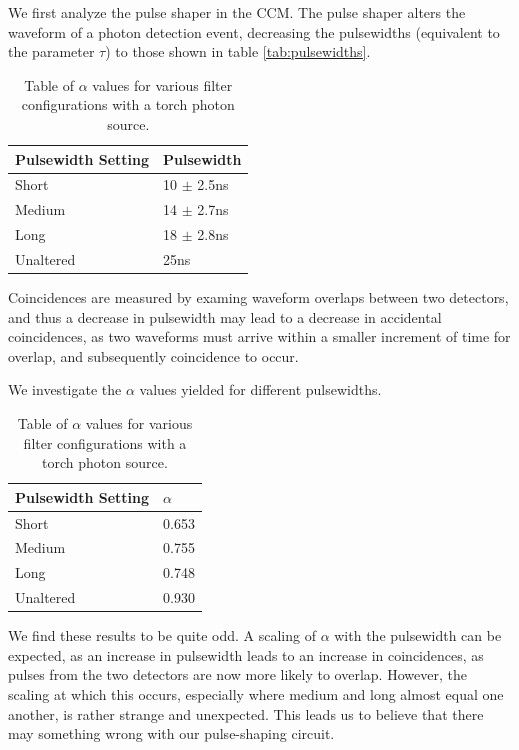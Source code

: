 \documentclass[letterpaper, 11 pt]{article}
\begin{document}
We first analyze the pulse shaper in the CCM. The pulse shaper alters the waveform of a
photon detection event, decreasing the pulsewidths (equivalent to the parameter $\tau$) to those shown in table \ref{tab:pulsewidths}.
\begin{table}[H]
    \centering
    \begin{tabular}{|l|l|}
    \hline
    \textbf{Pulsewidth Setting} & \textbf{Pulsewidth} \\ \hline
    Short        & 10 $\pm$ 2.5ns                   \\ \hline
    Medium        & 14 $\pm$ 2.7ns                   \\ \hline
    Long        & 18 $\pm$ 2.8ns                   \\ \hline
    Unaltered                  & 25ns                   \\ \hline
    \end{tabular}
    \caption{Table of $\alpha$ values for various filter configurations with a torch photon source.}
\end{table}\label{tab:pulsewidths}
Coincidences are measured by examing waveform overlaps between two
detectors, and thus a decrease in pulsewidth may lead to a decrease in accidental coincidences,
as two waveforms must arrive within a smaller increment of time for overlap,
and subsequently coincidence to occur.

We investigate the $\alpha$ values yielded for different pulsewidths.
\begin{table}[H]
    \centering
    \begin{tabular}{|l|l|}
    \hline
    \textbf{Pulsewidth Setting} & \textbf{$\alpha$} \\ \hline
    Short        & 0.653                   \\ \hline
    Medium        & 0.755                   \\ \hline
    Long        & 0.748                   \\ \hline
    Unaltered                  & 0.930                   \\ \hline
    \end{tabular}
    \caption{Table of $\alpha$ values for various filter configurations with a torch photon source.}
\end{table}\label{tab:pulsewidths}
We find these results to be quite odd. A scaling of $\alpha$ with the pulsewidth can be expected,
as an increase in pulsewidth leads to an increase in coincidences, as pulses from the two detectors are now
more likely to overlap. However, the scaling at which this occurs, especially where medium and long almost equal one another, is rather strange and unexpected. This leads us to believe that there may something wrong with our pulse-shaping circuit.
\end{document}
